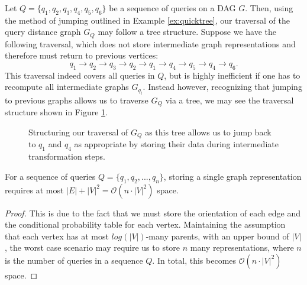 \begin{example} Let $Q = \{q_{1}, q_{2}, q_{3}, q_{4}, q_{5}, q_{6}\}$ be a sequence of queries on a DAG $G$. Then, using the method of jumping outlined in Example \ref{ex:quicktree}, our traversal of the query distance graph $G_{Q}$ may follow a tree structure. Suppose we have the following traversal, which does not store intermediate graph representations and therefore must return to previous vertices: $$q_{1} \rightarrow q_{2} \rightarrow q_{3} \rightarrow q_{2} \rightarrow q_{1} \rightarrow q_{4} \rightarrow q_{5} \rightarrow q_{4} \rightarrow q_{6}.$$\newline
\null \quad \quad This traversal indeed covers all queries in $Q$, but is highly inefficient if one has to recompute all intermediate graphs $G_{q_{i}}$. Instead however, recognizing that jumping to previous graphs allows us to traverse $G_{Q}$ via a tree, we may see the traversal structure shown in Figure \ref{fig:querydistancegraphex}.
\begin{figure}[h!]
\centering
{}
\caption{Structuring our traversal of $G_{Q}$ as this tree allows us to jump back to $q_{1}$ and $q_{4}$ as appropriate by storing their data during intermediate transformation steps. }
\label{fig:querydistancegraphex}
\end{figure}
\end{example}

\begin{lemma}\label{lem:representspace}
For a sequence of queries $Q=\{q_{1}, q_{2}, ..., q_{n}\}$, storing a single graph representation requires at most $|E| + |V|^{2} = \mathcal{O}(n \cdot  |V|^{2})$ space.
\end{lemma}
\begin{proof}
 This is due to the fact that we must store the orientation of each edge and the conditional probability table for each vertex. Maintaining the assumption that each vertex has at most $log(|V|)$-many parents, with an upper bound of $|V|$, the worst case scenario may require us to store $n$ many representations, where $n$ is the number of queries in a sequence $Q$. In total, this becomes $\mathcal{O}(n \cdot |V|^{2})$ space. 
\end{proof}

